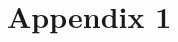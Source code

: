 \documentclass{article}
\begin{document}


\newpage
\tableofcontents
\newpage





\appendix
\section{Appendix 1}
\end{document}
